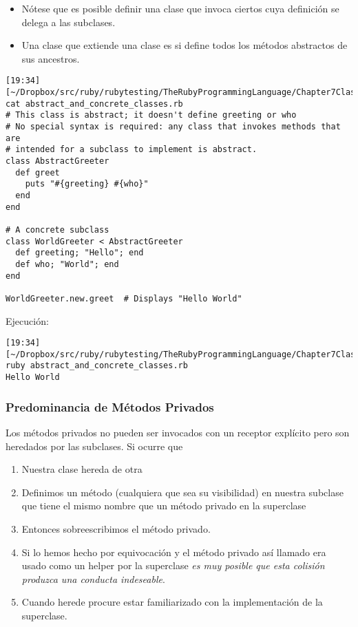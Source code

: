 \begin{itemize}
\item
Nótese que es posible definir una clase  que invoca ciertos 
cuya definición se delega a las subclases.
\item
Una clase que extiende una clase  es  si define todos
los métodos abstractos de sus ancestros.
\end{itemize}


\begin{verbatim}
[19:34][~/Dropbox/src/ruby/rubytesting/TheRubyProgrammingLanguage/Chapter7ClassesAndModules]$ cat abstract_and_concrete_classes.rb 
# This class is abstract; it doesn't define greeting or who
# No special syntax is required: any class that invokes methods that are
# intended for a subclass to implement is abstract.
class AbstractGreeter
  def greet
    puts "#{greeting} #{who}"
  end
end

# A concrete subclass
class WorldGreeter < AbstractGreeter
  def greeting; "Hello"; end
  def who; "World"; end
end

WorldGreeter.new.greet  # Displays "Hello World"
\end{verbatim}

Ejecución:
\begin{verbatim}
[19:34][~/Dropbox/src/ruby/rubytesting/TheRubyProgrammingLanguage/Chapter7ClassesAndModules]$ ruby abstract_and_concrete_classes.rb 
Hello World

\end{verbatim}

\subsubsection{Predominancia de Métodos Privados}
\label{subsubsection:predominancia_de_metodos_privados}
Los métodos privados no pueden ser invocados con un receptor explícito pero son heredados por las subclases.
Si ocurre que 
\begin{enumerate}
\item Nuestra clase hereda de otra
\item Definimos un método (cualquiera que sea su visibilidad)
en nuestra subclase que tiene el mismo nombre que un método privado en la superclase
\item Entonces sobreescribimos el método privado. 
\item Si lo hemos hecho por equivocación y el método privado 
así llamado era usado como un helper por la superclase
\emph{es muy posible que esta colisión produzca una conducta indeseable}.
\item Cuando herede procure estar familiarizado con la implementación de la superclase.
\end{enumerate}

